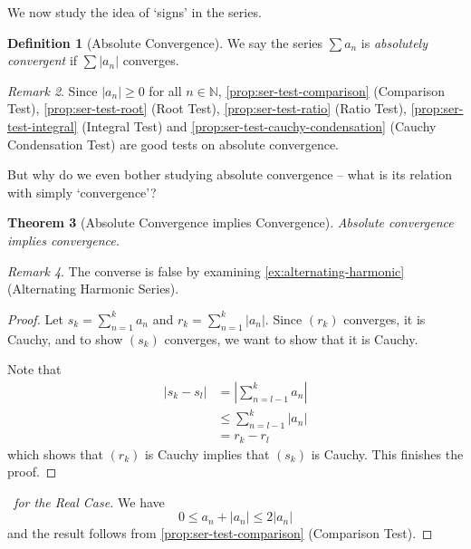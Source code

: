 \documentclass[11pt]{article}
\numberwithin{equation}{section}
\newtheorem{theorem}{Theorem}[section]
\theoremstyle{definition}
\newtheorem{definition}[theorem]{Definition}
\theoremstyle{remark}
\newtheorem{remark}[theorem]{Remark}
\newcommand{\pqty}[1]{\left(#1\right)}
\newcommand{\abs}[1]{\left|#1\right|}
\newcommand{\NN}{\mathbb N}
\begin{document}
We now study the idea of `signs' in the series.

\begin{definition}[Absolute Convergence]\label{analysis-unit-0054}
    \label{def:ser-absolute-convergence}%
    We say the series \(\sum a_n\) is \emph{absolutely convergent} if \(\sum \abs{a_n}\) converges.
\end{definition}

\begin{remark}\label{analysis-unit-0055}
    Since \(\abs{a_n} \geq 0\) for all \(n \in \NN\), \autoref{prop:ser-test-comparison} (Comparison Test), \autoref{prop:ser-test-root} (Root Test), \autoref{prop:ser-test-ratio} (Ratio Test), \autoref{prop:ser-test-integral} (Integral Test) and \autoref{prop:ser-test-cauchy-condensation} (Cauchy Condensation Test) are good tests on absolute convergence.
\end{remark}

But why do we even bother studying absolute convergence -- what is its relation with simply `convergence'?

\begin{theorem}[Absolute Convergence implies Convergence]\label{analysis-unit-0056}
    \label{thm:ser-absolute-convergence-implies-convergence}%
    Absolute convergence implies convergence.
\end{theorem}

\begin{remark}\label{analysis-unit-0057}
    The converse is false by examining \autoref{ex:alternating-harmonic} (Alternating Harmonic Series).
\end{remark}

\begin{proof}
    Let \(s_k = \sum_{n = 1}^{k} a_n\) and \(r_k = \sum_{n = 1}^{k} \abs{a_n}\). Since \(\pqty{r_k}\) converges, it is Cauchy, and to show \(\pqty{s_k}\) converges, we want to show that it is Cauchy.

    Note that
    \begin{align*}
        \abs{s_k - s_l} &= \abs{\sum_{n = l - 1}^{k} a_n} \\
        &\leq \sum_{n = l - 1}^{k} \abs{a_n} \\
        &= r_k - r_l
    \end{align*}
    which shows that \(\pqty{r_k}\) is Cauchy implies that \(\pqty{s_k}\) is Cauchy. This finishes the proof.
\end{proof}

\begin{proof}[\proofname\ for the Real Case]
    We have
    \[
        0 \leq a_n + \abs{a_n} \leq 2 \abs{a_n}
    \]
    and the result follows from \autoref{prop:ser-test-comparison} (Comparison Test).
\end{proof}
\end{document}
